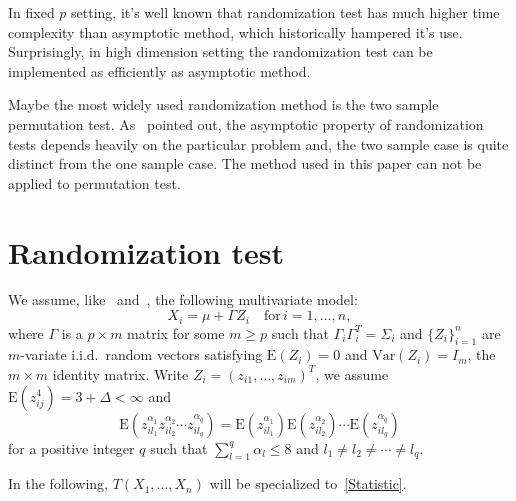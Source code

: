 \documentclass[review]{elsarticle}
\theoremstyle{plain}
\theoremstyle{definition}
\theoremstyle{remark}
\begin{document}
In fixed $p$ setting, it's well known that randomization test has much higher time complexity than asymptotic method, which  historically  hampered it's use. 
Surprisingly, in high dimension setting the randomization test can be implemented as efficiently as asymptotic method.



Maybe the most widely used randomization method is the two sample permutation test.
As~\cite{Romano1990On} pointed out, the asymptotic property of randomization tests depends heavily on the particular problem and, the two sample case is quite distinct from the one sample case.
The method used in this paper can not be applied to permutation test.

\section{Randomization test}
We assume, like~\cite{Chen2010A} and~\cite{Bai1996Efiect}, the following multivariate model:
\begin{equation}\label{chenC1}
    X_i=\mu+\Gamma Z_i\quad \textrm{for}\, i=1,\ldots,n,
\end{equation}
where $\Gamma$ is a $p\times m$ matrix for some $m\geq p$ such that $\Gamma_i\Gamma_i^T=\Sigma_i$ and ${\{Z_{i}\}}_{i=1}^n$ are $m$-variate i.i.d.\ random vectors satisfying $\mathrm{E}(Z_i)=0$ and $\mathrm{Var}(Z_i)=I_m$, the $m\times m$ identity matrix. Write $Z_i={(z_{i1},\ldots,z_{im})}^T$, we assume $\mathrm{E}(z_{ij}^4)=3+\Delta<\infty$ and
\begin{equation}\label{chenC2}
    \mathrm{E}(z_{il_1}^{\alpha_1}z_{il_2}^{\alpha_2}\cdots z_{il_q}^{\alpha_q})=\mathrm{E}(z_{il_1}^{\alpha_1})\mathrm{E}(z_{il_2}^{\alpha_2})\cdots \mathrm{E}(z_{il_q}^{\alpha_q})
\end{equation}
for a positive integer $q$ such that $\sum_{l=1}^q \alpha_l\leq 8$ and $l_1\neq l_2\neq \cdots \neq l_q$.

In the following, $T(X_1,\ldots, X_n)$ will be specialized to~\eqref{Statistic}.
\end{document}
